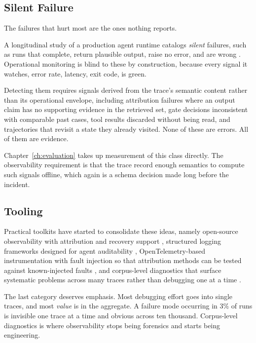 \subsection{Silent Failure}

The failures that hurt most are the ones nothing reports.

A longitudinal study of a production agent runtime catalogs \emph{silent}
failures, such as runs that complete, return plausible output, raise no error, and are
wrong \cite{silentfail2026}. Operational monitoring is blind to these by
construction, because every signal it watches, error rate, latency, exit code, is green.

Detecting them requires signals derived from the trace's semantic content rather
than its operational envelope, including attribution failures where an output claim has no
supporting evidence in the retrieved set, gate decisions inconsistent with
comparable past cases, tool results discarded without being read, and trajectories
that revisit a state they already visited. None of these are errors. All of them
are evidence.

Chapter~\ref{ch:evaluation} takes up measurement of this class directly. The
observability requirement is that the trace record enough semantics to compute
such signals offline, which again is a schema decision made long before the
incident.

\subsection{Tooling}

Practical toolkits have started to consolidate these ideas, namely open-source
observability with attribution and recovery support \cite{agentdebugx2026},
structured logging frameworks designed for agent auditability
\cite{agenttrace2026}, OpenTelemetry-based instrumentation with fault injection so
that attribution methods can be tested against known-injected faults
\cite{otelmas2026}, and corpus-level diagnostics that surface systematic problems
across many traces rather than debugging one at a time \cite{insights2026}.

The last category deserves emphasis. Most debugging effort goes into single
traces, and most \emph{value} is in the aggregate. A failure mode occurring in
3\% of runs is invisible one trace at a time and obvious across ten thousand.
Corpus-level diagnostics is where observability stops being forensics and starts
being engineering.

